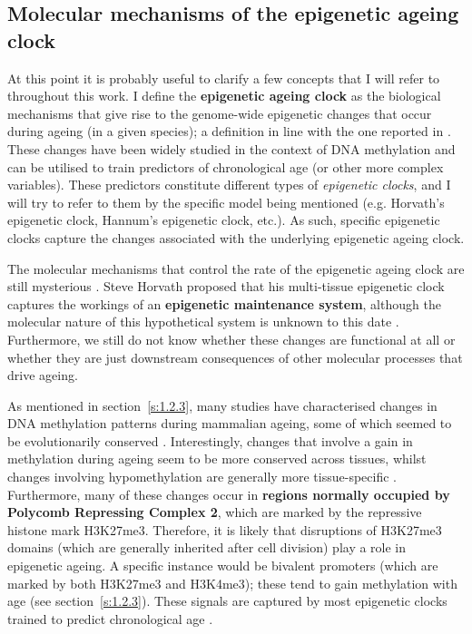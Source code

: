 \smallskip

\subsection{Molecular mechanisms of the epigenetic ageing clock} \label{s:1.3.3}

\smallskip

At this point it is probably useful to clarify a few concepts that I will refer to throughout this work. I define the \textbf{epigenetic ageing clock} as the biological mechanisms that give rise to the genome-wide epigenetic changes that occur during ageing (in a given species); a definition in line with the one reported in \cite{Horvath2018}. These changes have been widely studied in the context of DNA methylation and can be utilised to train predictors of chronological age (or other more complex variables). These predictors constitute different types of \textit{epigenetic clocks}, and I will try to refer to them by the specific model being mentioned (e.g. Horvath's epigenetic clock, Hannum's epigenetic clock, etc.). As such, specific epigenetic clocks capture the changes associated with the underlying epigenetic ageing clock.

\bigskip

The molecular mechanisms that control the rate of the epigenetic ageing clock are still mysterious \cite{Horvath2018,Field2018}. Steve Horvath proposed that his multi-tissue epigenetic clock captures the workings of an \textbf{epigenetic maintenance system}, although the molecular nature of this hypothetical system is unknown to this date \cite{Horvath2013}. Furthermore, we still do not know whether these changes are functional at all or whether they are just downstream consequences of other molecular processes that drive ageing. 

\bigskip

As mentioned in section~\ref{s:1.2.3}, many studies have characterised changes in DNA methylation patterns during mammalian ageing, some of which seemed to be evolutionarily conserved \cite{Lowe2018,Horvath2013}. Interestingly, changes that involve a gain in methylation during ageing seem to be more conserved across tissues, whilst changes involving hypomethylation are generally more tissue-specific \cite{Horvath2013,Yang2016}. Furthermore, many of these changes occur in \textbf{regions normally occupied by Polycomb Repressing Complex 2}, which are marked by the repressive histone mark H3K27me3. Therefore, it is likely that disruptions of H3K27me3 domains (which are generally inherited after cell division) play a role in epigenetic ageing. A specific instance would be bivalent promoters (which are marked by both H3K27me3 and H3K4me3); these tend to gain methylation with age (see section~\ref{s:1.2.3}). These signals are captured by most epigenetic clocks trained to predict chronological age \cite{Horvath2018}.

